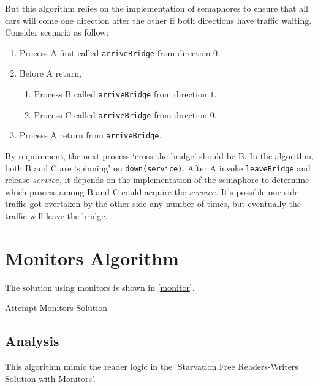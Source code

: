 \documentclass{article}
\begin{document}
But this algorithm relies on the implementation of semaphores to ensure that
all cars will come one direction after the other if both directions have
traffic waiting. Consider scenario as follow:
\begin{enumerate}
    \item Process A first called \verb|arriveBridge| from direction $0$.
    \item Before A return,
        \begin{enumerate}
            \item Process B called \verb|arriveBridge| from direction $1$.
            \item Process C called \verb|arriveBridge| from direction $0$.
        \end{enumerate}
    \item Process A return from \verb|arriveBridge|.
\end{enumerate}
By requirement, the next process `cross the bridge' should be B. In the
algorithm, both B and C are `spinning' on \verb|down(service)|. After A invoke
\verb|leaveBridge| and release $service$, it depends on the implementation of
the semaphore to determine which process among B and C could acquire the
$service$. It's possible one side traffic got overtaken by the other side any
number of times, but eventually the traffic will leave the bridge.

\pagebreak

\section*{Monitors Algorithm}

The solution using monitors is shown in \cref{monitor}.

\begin{algorithm}[H]
\caption{Attempt Monitors Solution}\label{monitor}
\begin{algorithmic}
    \State{}
        \EndIf{}
    \EndFunction{}
    \State{}
        \EndIf{}
    \EndFunction{}
\end{algorithmic}
\end{algorithm}

\subsection*{Analysis}

This algorithm mimic the reader logic in the `Starvation Free Readers-Writers
Solution with Monitors'.
\end{document}
